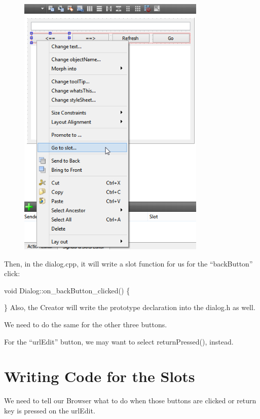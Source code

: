 \begin{figure}[htbp]
\centering
\includegraphics[width=0.8\textwidth]{../manuscript/images/GoToSlotBrowser}
\caption{}
\end{figure}

Then, in the dialog.cpp, it will write a slot function for us for the
``backButton'' click:

void Dialog::on\_backButton\_clicked() \{

\} Also, the Creator will write the prototype declaration into the
dialog.h as well.

We need to do the same for the other three buttons.

For the ``urlEdit'' button, we may want to select returnPressed(),
instead.

\section{Writing Code for the
Slots}\label{writing-code-for-the-slots}

We need to tell our Browser what to do when those buttons are clicked or
return key is pressed on the urlEdit.

